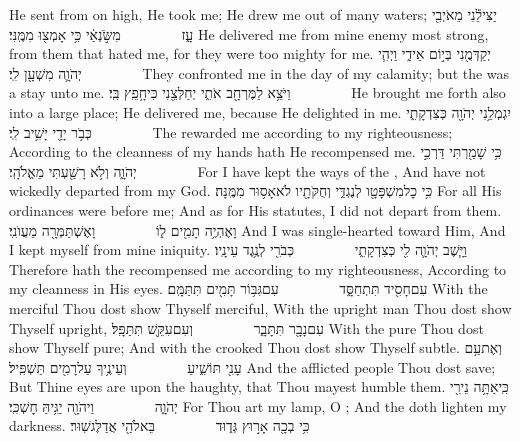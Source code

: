 {He sent from on high, He took me; He drew me out of many waters;}
{יַצִּילֵ֕נִי מֵאֹיְבִ֖י עָ֑ז         מִשֹּׂ֣נְאַ֔י כִּ֥י אָמְצ֖וּ מִמֶּֽנִּי׃}
{He delivered me from mine enemy most strong, from them that hated me, for they were too mighty for me.}
{יְקַדְּמֻ֖נִי בְּי֣וֹם אֵידִ֑י וַיְהִ֧י יְהֹוָ֛ה מִשְׁעָ֖ן לִֽי׃        }
{They confronted me in the day of my calamity; but the \lord\space was a stay unto me.}
{וַיֹּצֵ֥א לַמֶּרְחָ֖ב אֹתִ֑י יְחַלְּצֵ֖נִי כִּי\maqqaf חָ֥פֵֽץ בִּֽי׃        }
{He brought me forth also into a large place; He delivered me, because He delighted in me.}
{יִגְמְלֵ֥נִי יְהֹוָ֖ה כְּצִדְקָתִ֑י כְּבֹ֥ר יָדַ֖י יָשִׁ֥יב לִֽי׃        }
{The \lord\space rewarded me according to my righteousness; According to the cleanness of my hands hath He recompensed me.}
{כִּ֥י שָׁמַ֖רְתִּי דַּרְכֵ֣י יְהֹוָ֑ה וְלֹ֥א רָשַׁ֖עְתִּי מֵאֱלֹהָֽי׃        }
{For I have kept the ways of the \lord, And have not wickedly departed from my God.}
{כִּ֥י כׇל\maqqaf מִשְׁפָּטָ֖ו לְנֶגְדִּ֑י וְחֻקֹּתָ֖יו לֹא\maqqaf אָס֥וּר מִמֶּֽנָּה׃}
{For all His ordinances were before me; And as for His statutes, I did not depart from them.}
{וָאֶהְיֶ֥ה תָמִ֖ים ל֑וֹ         וָאֶשְׁתַּמְּרָ֖ה מֵעֲוֺנִֽי׃}
{And I was single-hearted toward Him, And I kept myself from mine iniquity.}
{וַיָּ֧שֶׁב יְהֹוָ֛ה לִ֖י כְּצִדְקָתִ֑י         כְּבֹרִ֖י לְנֶ֥גֶד עֵינָֽיו׃}
{Therefore hath the \lord\space recompensed me according to my righteousness, According to my cleanness in His eyes.}
{עִם\maqqaf חָסִ֖יד תִּתְחַסָּ֑ד         עִם\maqqaf גִּבּ֥וֹר תָּמִ֖ים תִּתַּמָּֽם׃}
{With the merciful Thou dost show Thyself merciful, With the upright man Thou dost show Thyself upright,}
{עִם\maqqaf נָבָ֖ר תִּתָּבָ֑ר         וְעִם\maqqaf עִקֵּ֖שׁ תִּתַּפָּֽל׃}
{With the pure Thou dost show Thyself pure; And with the crooked Thou dost show Thyself subtle.}
{וְאֶת\maqqaf עַ֥ם עָנִ֖י תּוֹשִׁ֑יעַ         וְעֵינֶ֥יךָ עַל\maqqaf רָמִ֖ים תַּשְׁפִּֽיל׃}
{And the afflicted people Thou dost save; But Thine eyes are upon the haughty, that Thou mayest humble them.}
{כִּֽי\maqqaf אַתָּ֥ה נֵירִ֖י יְהֹוָ֑ה         וַיהֹוָ֖ה יַגִּ֥יהַּ חׇשְׁכִּֽי׃}
{For Thou art my lamp, O \lord; And the \lord\space doth lighten my darkness.}
{כִּ֥י בְכָ֖ה אָר֣וּץ גְּד֑וּד         בֵּאלֹהַ֖י אֲדַלֶּג\maqqaf שֽׁוּר׃}
